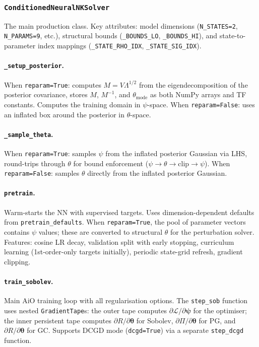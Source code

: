 \documentclass[11pt,a4paper]{article}
\theoremstyle{definition}
\newcommand{\btheta}{\boldsymbol{\theta}}
\newcommand{\bpsi}{\boldsymbol{\psi}}
\newcommand{\code}[1]{\texttt{\color{codecolor}#1}}
\begin{document}
	\subsubsection{\code{ConditionedNeuralNKSolver}}
	
	The main production class.
	Key attributes: model dimensions (\code{N\_STATES=2}, \code{N\_PARAMS=9}, etc.), structural bounds (\code{\_BOUNDS\_LO}, \code{\_BOUNDS\_HI}), and state-to-parameter index mappings (\code{\_STATE\_RHO\_IDX}, \code{\_STATE\_SIG\_IDX}).
	
	\paragraph{\code{\_setup\_posterior}.}
	When \code{reparam=True}: computes $M = V\Lambda^{1/2}$ from the eigendecomposition of the posterior covariance, stores $M$, $M^{-1}$, and $\theta_{\mathrm{mode}}$ as both NumPy arrays and TF constants.
	Computes the training domain in $\psi$-space.
	When \code{reparam=False}: uses an inflated box around the posterior in $\theta$-space.
	
	\paragraph{\code{\_sample\_theta}.}
	When \code{reparam=True}: samples $\psi$ from the inflated posterior Gaussian via LHS, round-trips through $\theta$ for bound enforcement ($\psi \to \theta \to \mathrm{clip} \to \psi$).
	When \code{reparam=False}: samples $\theta$ directly from the inflated posterior Gaussian.
	
	\paragraph{\code{pretrain}.}
	Warm-starts the NN with supervised targets.
	Uses dimension-dependent defaults from \code{pretrain\_defaults}.
	When \code{reparam=True}, the pool of parameter vectors contains $\psi$ values; these are converted to structural $\theta$ for the perturbation solver.
	Features: cosine LR decay, validation split with early stopping, curriculum learning (1st-order-only targets initially), periodic state-grid refresh, gradient clipping.
	
	\paragraph{\code{train\_sobolev}.}
	Main AiO training loop with all regularisation options.
	The \code{step\_sob} function uses nested \code{GradientTape}s: the outer tape computes $\partial\mathcal{L}/\partial\bpsi$ for the optimiser; the inner persistent tape computes $\partial R/\partial\btheta$ for Sobolev, $\partial\Pi/\partial\btheta$ for PG, and $\partial R/\partial\btheta$ for GC.
	Supports DCGD mode (\code{dcgd=True}) via a separate \code{step\_dcgd} function.
	
\end{document}
